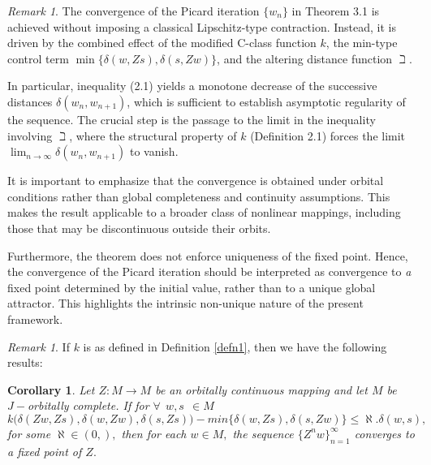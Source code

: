 \documentclass[11pt,reqno]{amsart}
\newtheorem{corollary}[theorem]{Corollary}
\theoremstyle{definition}
\theoremstyle{remark}
\newtheorem{remark}[theorem]{Remark}
\numberwithin{equation}{section}
\begin{document}
			\begin{remark}
			The convergence of the Picard iteration $\{w_n\}$ in Theorem 3.1 is achieved without imposing a classical Lipschitz-type contraction. Instead, it is driven by the combined effect of the modified C-class function $k$, the min-type control term $\min\{\delta(w,Zs),\delta(s,Zw)\}$, and the altering distance function $\beth$.
			
			In particular, inequality (2.1) yields a monotone decrease of the successive distances $\delta(w_n,w_{n+1})$, which is sufficient to establish asymptotic regularity of the sequence. The crucial step is the passage to the limit in the inequality involving $\beth$, where the structural property of $k$ (Definition 2.1) forces the limit $\lim_{n\to\infty}\delta(w_n,w_{n+1})$ to vanish.
			
			It is important to emphasize that the convergence is obtained under orbital conditions rather than global completeness and continuity assumptions. This makes the result applicable to a broader class of nonlinear mappings, including those that may be discontinuous outside their orbits.
			
			Furthermore, the theorem does not enforce uniqueness of the fixed point. Hence, the convergence of the Picard iteration should be interpreted as convergence to \emph{a} fixed point determined by the initial value, rather than to a unique global attractor. This highlights the intrinsic non-unique nature of the present framework.
		\end{remark}
		
		\begin{remark}
			If $k$ is as defined in Definition \ref{defn1}, then we have the following results:
		\end{remark}
				
		\begin{corollary}
			Let $Z:M \to M$ be an orbitally continuous mapping and let $M$ be $J-$orbitally complete. If for $\forall~~w, s ~~\in M$
		\begin{equation}
			k\Big( \delta(Zw,Zs), \delta(w,Zw), \delta(s, Zs)\Big)- min\{\delta(w,Zs), \delta(s, Zw)\} \leq \aleph . \delta(w,s),
		\end{equation}
		for some $\aleph \in (0,),$ then for each $w \in M,$ the sequence $\{Z^nw\}^\infty_{n=1}$ converges to a fixed point of $Z.$
		\end{corollary}
		
\end{document}
